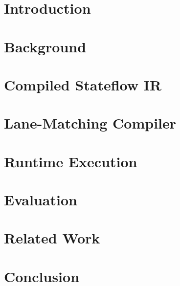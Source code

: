 \documentclass[sigconf, nonacm]{acmart}
\begin{document}
\section{Introduction}\label{sec:intro}


\section{Background}\label{sec:background}


\section{Compiled Stateflow IR}\label{sec:ir}


\section{Lane-Matching Compiler}\label{sec:compiler}


\section{Runtime Execution}\label{sec:runtime}


\section{Evaluation}\label{sec:eval}


\section{Related Work}\label{sec:related}


\section{Conclusion}\label{sec:conclusion}




\end{document}
